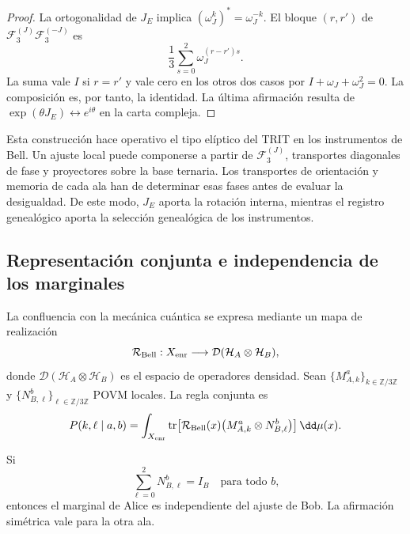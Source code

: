 \begin{proof}
La ortogonalidad de \(J_E\) implica
\((\omega_J^k)^{\!*}=\omega_J^{-k}\). El bloque \((r,r')\) de
\(\mathcal F_3^{(J)}\mathcal F_3^{(-J)}\) es
\[
 \frac13\sum_{s=0}^{2}\omega_J^{(r-r')s}.
\]
La suma vale \(I\) si \(r=r'\) y vale cero en los otros dos casos por
\(I+\omega_J+\omega_J^2=0\). La composición es, por tanto, la identidad.
La última afirmación resulta de
\(\exp(\theta J_E)\leftrightarrow e^{i\theta}\) en la carta compleja.
\end{proof}

Esta construcción hace operativo el tipo elíptico del TRIT en los instrumentos de
Bell. Un ajuste local puede componerse a partir de
\(\mathcal F_3^{(J)}\), transportes diagonales de fase y proyectores sobre la base
ternaria. Los transportes de orientación y memoria de cada ala han de determinar
esas fases antes de evaluar la desigualdad. De este modo, \(J_E\) aporta la rotación
interna, mientras el registro genealógico aporta la selección genealógica de los instrumentos.

\subsection{Representación conjunta e independencia de los marginales}

La confluencia con la mecánica cuántica se expresa mediante un mapa de realización
\begin{equation}
 \mathcal R_{\rm Bell}:X_{\rm enr}\longrightarrow
 \mathcal D(\mathcal H_A\otimes\mathcal H_B),
 \label{eq:realizacion-bell}
\end{equation}
donde \(\mathcal D(\mathcal H_A\otimes\mathcal H_B)\) es el espacio de
operadores densidad. Sean
\(\{M_{A,k}^{a}\}_{k\in\mathbb Z/3\mathbb Z}\) y
\(\{N_{B,\ell}^{b}\}_{\ell\in\mathbb Z/3\mathbb Z}\) POVM locales. La
regla conjunta es
\begin{equation}
 P(k,\ell\mid a,b)
 =\int_{X_{\rm enr}}
  \operatorname{tr}\!\left[
   \mathcal R_{\rm Bell}(x)
   \bigl(M_{A,k}^{a}\otimes N_{B,\ell}^{b}\bigr)
  \right]\dd\mu(x).
 \label{eq:born-bell-hmt}
\end{equation}

\begin{proposition}
\label{prop:no-signaling-hmt}
Si
\[
 \sum_{\ell=0}^{2}N_{B,\ell}^{b}=I_B
 \quad\text{para todo }b,
\]
entonces el marginal de Alice es independiente del ajuste de Bob. La afirmación
simétrica vale para la otra ala.
\end{proposition}

